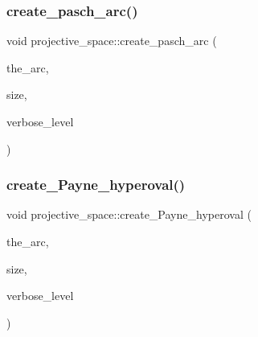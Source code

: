 \mbox{\label{classprojective__space_ac61f379ca24cdefee7b080f894c36c58}} 
\subsubsection{\texorpdfstring{create\+\_\+pasch\+\_\+arc()}{create\_pasch\_arc()}}
{\footnotesize\ttfamily void projective\+\_\+space\+::create\+\_\+pasch\+\_\+arc (\begin{DoxyParamCaption}\item[{\mbox{\hyperlink{galois_8h_a09fddde158a3a20bd2dcadb609de11dc}{I\+NT}} $\ast$}]{the\+\_\+arc,  }\item[{\mbox{\hyperlink{galois_8h_a09fddde158a3a20bd2dcadb609de11dc}{I\+NT}} \&}]{size,  }\item[{\mbox{\hyperlink{galois_8h_a09fddde158a3a20bd2dcadb609de11dc}{I\+NT}}}]{verbose\+\_\+level }\end{DoxyParamCaption})}

\mbox{\label{classprojective__space_a212d13099740e836268bcf470ec5aadc}} 
\subsubsection{\texorpdfstring{create\+\_\+\+Payne\+\_\+hyperoval()}{create\_Payne\_hyperoval()}}
{\footnotesize\ttfamily void projective\+\_\+space\+::create\+\_\+\+Payne\+\_\+hyperoval (\begin{DoxyParamCaption}\item[{\mbox{\hyperlink{galois_8h_a09fddde158a3a20bd2dcadb609de11dc}{I\+NT}} $\ast$}]{the\+\_\+arc,  }\item[{\mbox{\hyperlink{galois_8h_a09fddde158a3a20bd2dcadb609de11dc}{I\+NT}} \&}]{size,  }\item[{\mbox{\hyperlink{galois_8h_a09fddde158a3a20bd2dcadb609de11dc}{I\+NT}}}]{verbose\+\_\+level }\end{DoxyParamCaption})}

\mbox{\label{classprojective__space_ab1b2ffcefe646e6d9d9ae435dfedd29e}} 
